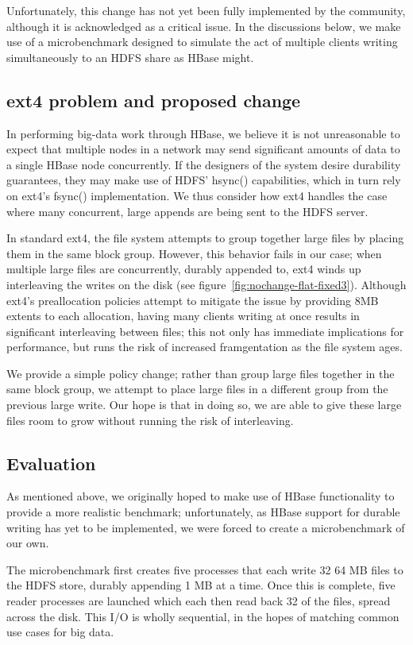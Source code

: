 \documentclass{acm_proc_article-sp}
\begin{document}
Unfortunately, this change has not yet been fully implemented by the community, although it is acknowledged as a critical issue\cite{hbaseissue}.  In the discussions below, we make use of a microbenchmark designed to simulate the act of multiple clients writing simultaneously to an HDFS share as HBase might.

\subsection{ext4 problem and proposed change}
In performing big-data work through HBase, we believe it is not unreasonable to expect that multiple nodes in a network may send significant amounts of data to a single HBase node concurrently.  If the designers of the system desire durability guarantees, they may make use of HDFS' hsync() capabilities, which in turn rely on ext4's fsync() implementation.  We thus consider how ext4 handles the case where many concurrent, large appends are being sent to the HDFS server.
 
In standard ext4, the file system attempts to group together large files by placing them in the same block group.  However, this behavior fails in our case; when multiple large files are concurrently, durably appended to, ext4 winds up interleaving the writes on the disk (see figure~\ref{fig:nochange-flat-fixed3}).  Although ext4's preallocation policies attempt to mitigate the issue by providing 8MB extents to each allocation, having many clients writing at once results in significant interleaving between files; this not only has immediate implications for performance, but runs the risk of increased framgentation as the file system ages.
 
We provide a simple policy change; rather than group large files together in the same block group, we attempt to place large files in a different group from the previous large write.  Our hope is that in doing so, we are able to give these large files room to grow without running the risk of interleaving.

\subsection{Evaluation}
As mentioned above, we originally hoped to make use of HBase functionality to provide a more realistic benchmark; unfortunately, as HBase support for durable writing has yet to be implemented, we were forced to create a microbenchmark of our own.
 
The microbenchmark first creates five processes that each write 32 64 MB files to the HDFS store, durably appending 1 MB at a time.  Once this is complete, five reader processes are launched which each then read back 32 of the files, spread across the disk.  This I/O is wholly sequential, in the hopes of matching common use cases for big data.
 
\end{document}
